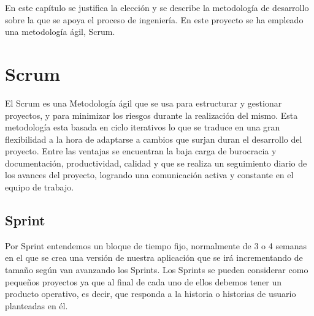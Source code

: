 En este capítulo se justifica la elección y se describe la metodología de desarrollo sobre la que se apoya el proceso de ingeniería. En este proyecto se ha empleado una metodología ágil, Scrum. 



\section{Scrum}

El Scrum es una  Metodología ágil \cite{6} \cite{9} que se usa para estructurar y gestionar proyectos, y para minimizar los riesgos durante la realización del mismo.
Esta metodología esta basada en ciclo iterativos lo que se traduce en una gran flexibilidad a la hora de adaptarse a cambios que surjan duran el desarrollo del proyecto.
Entre las ventajas se encuentran la baja carga de burocracia y documentación, productividad, calidad y que se realiza un seguimiento diario de los avances del proyecto, logrando una comunicación activa y constante en el equipo de trabajo.\\

\subsection{Sprint}

Por Sprint entendemos un bloque de tiempo fijo, normalmente de 3 o 4 semanas en el que
se crea una versión de nuestra aplicación que se irá incrementando de tamaño
según van avanzando los Sprints. Los Sprints se pueden considerar como pequeños
proyectos ya que al final de cada uno de ellos debemos tener un producto
operativo, es decir, que responda a la historia o historias de usuario planteadas en él.



